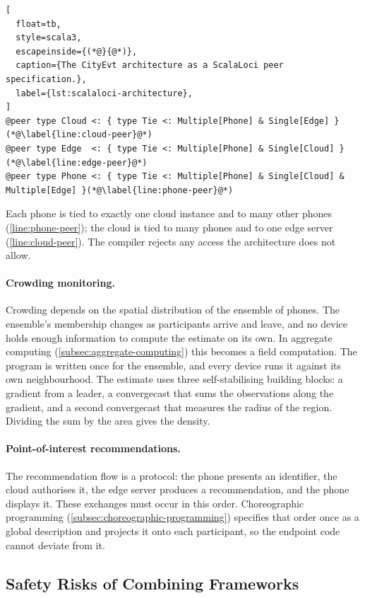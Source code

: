 \begin{lstlisting}[
  float=tb,
  style=scala3,
  escapeinside={(*@}{@*)},
  caption={The CityEvt architecture as a ScalaLoci peer specification.},
  label={lst:scalaloci-architecture},
]
@peer type Cloud <: { type Tie <: Multiple[Phone] & Single[Edge] }(*@\label{line:cloud-peer}@*)
@peer type Edge  <: { type Tie <: Multiple[Phone] & Single[Cloud] }(*@\label{line:edge-peer}@*)
@peer type Phone <: { type Tie <: Multiple[Phone] & Single[Cloud] & Multiple[Edge] }(*@\label{line:phone-peer}@*)
\end{lstlisting}

Each phone is tied to exactly one cloud instance and to many other phones (\cref{line:phone-peer});
the cloud is tied to many phones and to one edge server (\cref{line:cloud-peer}).
%
The compiler rejects any access the architecture does not allow.

\paragraph{Crowding monitoring.}
Crowding depends on the spatial distribution of the ensemble of phones.
%
The ensemble's membership changes as participants arrive and leave,
and no device holds enough information to compute the estimate on its own.
%
In aggregate computing (\cref{subsec:aggregate-computing}) this becomes a field computation.
The program is written once for the ensemble, and every device runs it against its own neighbourhood.
%
The estimate uses three self-stabilising building blocks:
a gradient from a leader, a convergecast that sums the observations along the gradient, and a second convergecast that measures the radius of the region.
%
Dividing the sum by the area gives the density.

\paragraph{Point-of-interest recommendations.}
The recommendation flow is a protocol:
the phone presents an identifier, the cloud authorises it, the edge server produces a recommendation, and the phone displays it.
%
These exchanges must occur in this order.
%
Choreographic programming (\cref{subsec:choreographic-programming}) specifies that order once as a global description and projects it onto each participant,
so the endpoint code cannot deviate from it.

\subsection{Safety Risks of Combining Frameworks}
\label{subsec:multiparty-challenge}

